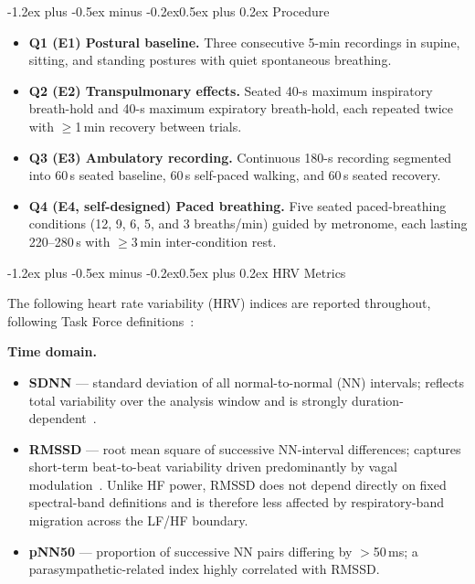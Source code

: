 \documentclass[11pt,a4paper]{article}
\makeatletter
\renewcommand\section{\@startsection{section}{1}{\z@}%
  {-1.2ex plus -0.5ex minus -0.2ex}{0.5ex plus 0.2ex}%
  {\normalfont\large\bfseries}}
\makeatother
\begin{document}
\section{Procedure}
\begin{itemize}
\setlength{\itemsep}{0.1em}
\item \textbf{Q1 (E1) Postural baseline.} Three consecutive 5-min
  recordings in supine, sitting, and standing postures with quiet
  spontaneous breathing.
\item \textbf{Q2 (E2) Transpulmonary effects.} Seated 40-s maximum
  inspiratory breath-hold and 40-s maximum expiratory breath-hold, each
  repeated twice with $\geq$1\,min recovery between trials.
\item \textbf{Q3 (E3) Ambulatory recording.} Continuous 180-s recording
  segmented into 60\,s seated baseline, 60\,s self-paced walking, and
  60\,s seated recovery.
\item \textbf{Q4 (E4, self-designed) Paced breathing.} Five seated
  paced-breathing conditions (12, 9, 6, 5, and 3 breaths/min) guided by
  metronome, each lasting 220--280\,s with $\geq$3\,min inter-condition
  rest.
\end{itemize}

\section{HRV Metrics}

The following heart rate variability (HRV) indices are reported
throughout, following Task Force definitions~\cite{taskforce1996}:

\textbf{Time domain.}
\begin{itemize}\setlength{\itemsep}{0.1em}
\item \textbf{SDNN} --- standard deviation of all normal-to-normal (NN)
  intervals; reflects total variability over the analysis window and is
  strongly duration-dependent~\cite{taskforce1996}.
\item \textbf{RMSSD} --- root mean square of successive NN-interval
  differences; captures short-term beat-to-beat variability driven
  predominantly by vagal modulation~\cite{taskforce1996,shaffer2017}.
  Unlike HF power, RMSSD does not depend directly on fixed spectral-band
  definitions and is therefore less affected by respiratory-band migration
  across the LF/HF boundary.
\item \textbf{pNN50} --- proportion of successive NN pairs differing by
  $>$50\,ms; a parasympathetic-related index highly correlated with RMSSD.
\end{itemize}
\end{document}
